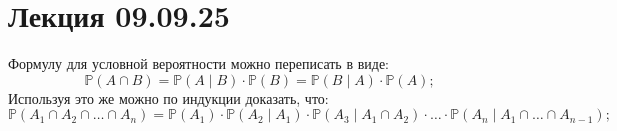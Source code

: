 \documentclass[12pt,a4paper]{article}
\begin{document}
\section{Лекция 09.09.25}

Формулу для условной вероятности можно переписать в виде: \[ \mathbb{P} \left( A \cap B\right) = \mathbb{P} \left( A \mid B\right) \cdot \mathbb{P} \left( B\right) = \mathbb{P} \left( B \mid A\right) \cdot \mathbb{P} \left( A\right);\]
Используя это же можно по индукции доказать, что: \[ \mathbb{P} \left( A_1 \cap A_2 \cap \dots \cap A_n \right) = \mathbb{P} \left( A_1 \right) \cdot \mathbb{P} \left( A_2 \mid A_1 \right) \cdot \mathbb{P} \left( A_3 \mid A_1 \cap A_2 \right) \cdot \ldots \cdot \mathbb{P}\left(A_n \mid A_1 \cap \dots \cap A_{n-1}\right);\]
\end{document}
